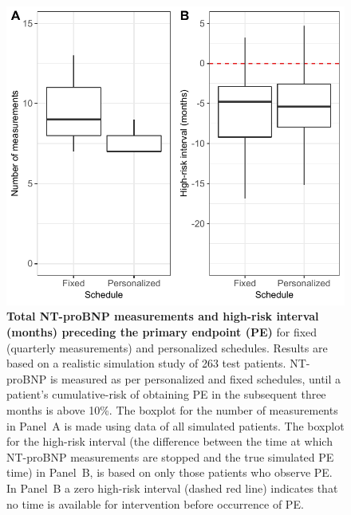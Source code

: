 \begin{subappendices}
\begin{figure}
\includegraphics{contents/c6/images/c6_fig_app2.pdf}
\caption{\textbf{Total NT-proBNP measurements and high-risk interval (months) preceding the primary endpoint (PE)} for fixed (quarterly measurements) and personalized schedules. Results are based on a realistic simulation study of 263 test patients. NT-proBNP is measured as per personalized and fixed schedules, until a patient's cumulative-risk of obtaining PE in the subsequent three months is above 10\%. The boxplot for the number of measurements in Panel~A is made using data of all simulated patients. The boxplot for the high-risk interval (the difference between the time at which NT-proBNP measurements are stopped and the true simulated PE time) in Panel~B, is based on only those patients who observe PE. In Panel~B a zero high-risk interval (dashed red line) indicates that no time is available for intervention before occurrence of PE.}
\label{c6:fig:app2}
\end{figure}
\end{subappendices}